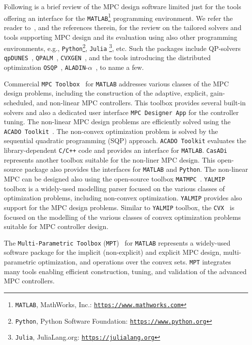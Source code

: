 \documentclass[letterpaper, 10 pt, conference]{ieeeconf}
\begin{document}
Following is a brief review of the MPC design software limited just for the tools offering an interface for the \texttt{MATLAB}\footnote{\texttt{MATLAB}, MathWorks, Inc.: \texttt{\url{https://www.mathworks.com}}} programming environment. We refer the reader to~\cite{KF18,LT17,HS22}, 
and the references therein, for the review on the tailored solvers and tools supporting MPC design and its evaluation using also other programming environments, e.g., \texttt{Python}\footnote{\texttt{Python}, Python Software Foundation: \texttt{\url{https://www.python.org}}}, \texttt{Julia} \footnote{\texttt{Julia}, JuliaLang.org: \texttt{\url{https://julialang.org}}}, etc. Such the packages include QP-solvers \texttt{qpDUNES}~\cite{qpDUNES}, \texttt{QPALM}~\cite{QPALM}, \texttt{CVXGEN}~\cite{CVXGEN}, and the tools introducing the distributed optimization \texttt{OSQP}~\cite{OSQP}, \texttt{ALADIN}-$\alpha$~\cite{EJ21}, to name a few. 

Commercial \texttt{MPC Toolbox}~\cite{MPC_toolbox} for \texttt{MATLAB} addresses various classes of the MPC design problems, including the construction of the adaptive, explicit, gain-scheduled, and non-linear MPC controllers. This toolbox provides several built-in solvers and also a dedicated user interface \texttt{MPC Designer App} for the controller tuning. 
%
The non-linear MPC design problems are efficiently solved using the \texttt{ACADO Toolkit}~\cite{ACADO_Toolkit}. The non-convex optimization problem is solved by the sequential quadratic programming (SQP) approach.  \texttt{ACADO Toolkit} evaluates the library-dependent \texttt{C/C++} code and provides an interface for \texttt{MATLAB}. 
%
\texttt{CasADi}~\cite{CasADi} represents another toolbox suitable for the non-liner MPC design. This open-source package also provides the interfaces for \texttt{MATLAB} and \texttt{Python}. 
%
The non-linear MPC can be designed also using the open-source toolbox \texttt{MATMPC}~\cite{MATMPC}. 
%
\texttt{YALMIP}~\cite{L04} toolbox is a widely-used modelling parser focused on the various classes of optimization problems, including non-convex optimization. \texttt{YALMIP} provides also support for the MPC design problems. 
%
Similar to \texttt{YALMIP} toolbox, the \texttt{CVX}~\cite{GB08} is focused on the modelling of the various classes of convex optimization problems suitable for MPC controller design. 

The \texttt{Multi-Parametric Toolbox} (\texttt{MPT})~\cite{MPT3} for \texttt{MATLAB} represents a widely-used software package for the implicit (non-explicit) and explicit MPC design, multi-parametric optimization, and operations over the convex sets. \texttt{MPT} integrates many tools enabling efficient construction, tuning, and validation of the advanced MPC controllers. 
\end{document}
